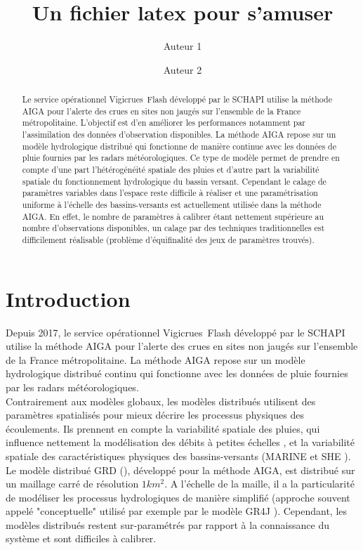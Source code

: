\documentclass[a4paper,11pt]{article}
\title{Un fichier latex pour s'amuser}
\author[1]{Auteur 1}
\author[2]{Auteur 2}
\affil[1]{IRSTEA, unité de recherche en hydrologie RECOVER, 3275 route de Cézanne, Aix-en-Provence.}
\affil[2]{IRSTEA, unité de recherche GEAU, 361 rue J.F. Breton, 34196 Montpellier, France.}
\begin{document}
  

\maketitle


\begin{abstract}
Le service opérationnel Vigicrues Flash développé par le SCHAPI utilise la méthode AIGA pour l’alerte des crues en sites non jaugés sur l’ensemble de la France métropolitaine. L’objectif est d’en améliorer les performances notamment par l’assimilation des données d’observation disponibles. La méthode AIGA repose sur un modèle hydrologique distribué qui fonctionne de manière continue avec les données de pluie fournies par les radars météorologiques. Ce type de modèle permet de prendre en compte d’une part l’hétérogénéité spatiale des pluies et d’autre part la variabilité spatiale du fonctionnement hydrologique du bassin versant. Cependant le calage de paramètres variables dans l’espace reste difficile à réaliser et une paramétrisation uniforme à l’échelle des bassins-versants est actuellement utilisée dans la méthode AIGA. En effet, le nombre de paramètres à calibrer étant nettement supérieure au nombre d’observations disponibles, un calage par des techniques traditionnelles est difficilement réalisable (problème d’équifinalité des jeux de paramètres trouvés).\\
\end{abstract}


\section{Introduction}

Depuis 2017, le service opérationnel Vigicrues Flash développé par le SCHAPI utilise la méthode AIGA pour l’alerte des crues en sites non jaugés sur l’ensemble de la France métropolitaine. La méthode AIGA repose sur un modèle hydrologique distribué continu qui fonctionne avec les données de pluie fournies par les radars météorologiques.\\
Contrairement aux modèles globaux, les modèles distribués utilisent des paramètres spatialisés pour mieux décrire les processus physiques des écoulements. Ils prennent en compte la variabilité spatiale des pluies, qui influence nettement la modélisation des débits à petites échelles \citep{merz2009regional}, et la variabilité spatiale des caractéristiques physiques des bassins-versants (MARINE \citep{estupina2006flash} et SHE \citep{abbott1986introduction}). Le modèle distribué GRD (\citep{javelle2014AIGA}), développé pour la méthode AIGA, est distribué sur un maillage carré de résolution $1km^2$. A l'échelle de la maille, il a la particularité de modéliser les processus hydrologiques de manière simplifié (approche souvent appelé "conceptuelle" utilisé par exemple par le modèle GR4J \citep{perrin2003improvement}). Cependant, les modèles distribués restent sur-paramétrés par rapport à la connaissance du système et sont difficiles à calibrer.\\
\end{document}
